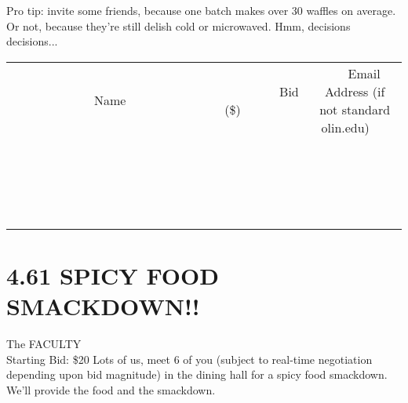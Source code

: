 \documentclass[11pt]{article}
\begin{document}
Pro tip: invite some friends, because one batch makes over 30 waffles on average. Or not, because they're still delish cold or microwaved. Hmm, decisions decisions...
\\[3ex]
\begin{tabular}{c c c}
~~~~~~~~~~~~~Name~~~~~~~~~~~~~ & ~~~~~~~~~Bid (\$)~~~~~~~~~  & ~~~Email Address (if not standard olin.edu)~~~\\
 & & \\
\hline
 & & \\
\hline
 & & \\
\hline
 & & \\
\hline
 & & \\
\hline
 & & \\
\hline
 & & \\
\hline
 & & \\
\hline
 & & \\
\hline
 & & \\
\hline
 & & \\
\hline
 & & \\
\hline
 & & \\
\hline
 & & \\
\hline
 & & \\
\hline
 & & \\
\hline
 & & \\
\hline
 & & \\
\hline
 & & \\
\hline
\end{tabular}
\newpage
\section*{4.61 SPICY FOOD SMACKDOWN!!}
The FACULTY
\\
Starting Bid: \$20
\newline
Lots of us, meet 6 of you (subject to real-time negotiation depending upon bid magnitude) in the dining hall for a spicy food smackdown. We'll provide the food and the smackdown.
\end{document}
